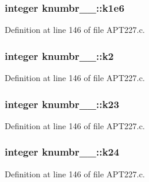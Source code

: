 \subsubsection[{\texorpdfstring{k1e6}{k1e6}}]{\setlength{\rightskip}{0pt plus 5cm}integer knumbr\+\_\+\_\+\+::k1e6}\hypertarget{structknumbr__1___a084294f5dd51fd0a629f2fd871ef5ea2}{}\label{structknumbr__1___a084294f5dd51fd0a629f2fd871ef5ea2}


Definition at line 146 of file A\+P\+T227.\+c.

\subsubsection[{\texorpdfstring{k2}{k2}}]{\setlength{\rightskip}{0pt plus 5cm}integer knumbr\+\_\+\_\+\+::k2}\hypertarget{structknumbr__1___a536a37c4b5395142244a8ce3e9f311b0}{}\label{structknumbr__1___a536a37c4b5395142244a8ce3e9f311b0}


Definition at line 146 of file A\+P\+T227.\+c.

\subsubsection[{\texorpdfstring{k23}{k23}}]{\setlength{\rightskip}{0pt plus 5cm}integer knumbr\+\_\+\_\+\+::k23}\hypertarget{structknumbr__1___a58cac1c491c7a8818d9c0c6262197231}{}\label{structknumbr__1___a58cac1c491c7a8818d9c0c6262197231}


Definition at line 146 of file A\+P\+T227.\+c.

\subsubsection[{\texorpdfstring{k24}{k24}}]{\setlength{\rightskip}{0pt plus 5cm}integer knumbr\+\_\+\_\+\+::k24}\hypertarget{structknumbr__1___a13bf6d85a8fa5e51e1c945ce4aa09f5d}{}\label{structknumbr__1___a13bf6d85a8fa5e51e1c945ce4aa09f5d}


Definition at line 146 of file A\+P\+T227.\+c.

